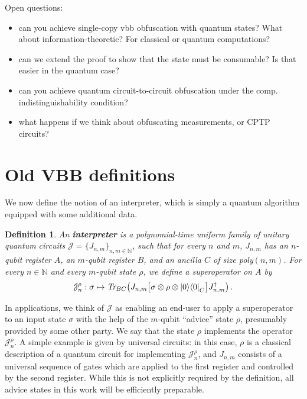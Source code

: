 \documentclass[11pt]{article}
\numberwithin{equation}{section}
\newtheorem{definition}{Definition}
\newcommand{\N}{\mathbb{N}}
\begin{document}
{Open questions:
\begin{itemize}
\item can you achieve single-copy vbb obfuscation with quantum states? What about information-theoretic? For classical or quantum computations?
\item can we extend the proof to show that the state must be consumable? Is that easier in the quantum case?
\item can you achieve quantum circuit-to-circuit obfuscation under the comp. indistinguishability condition?
\item what happens if we think about obfuscating measurements, or CPTP circuits?
\end{itemize}



\appendix

\section{Old VBB definitions}

We now define the notion of an interpreter, which is simply a quantum algorithm equipped with some additional data.

\begin{definition}
An \textbf{interpreter} is a polynomial-time uniform family of unitary quantum circuits $\mathcal J = \{J_{n, m}\}_{n, m \in \N}$, such that for every $n$ and $m$, $J_{n, m}$ has an $n$-qubit register $A$, an $m$-qubit register $B$, and an ancilla $C$ of size poly$(n, m)$. For every $n \in \N$ and every $m$-qubit state $\rho$, we define a superoperator on $A$ by
$$
\mathcal J_n^\rho : \sigma \mapsto \emph{Tr}_{BC}\bigl( J_{n, m}\bigl[ \sigma \otimes \rho \otimes {\left\vert{0}\right\rangle}{\left\langle{0}\right\vert}_C \bigr]J_{n, m}^\dagger\bigr)\,.
$$
\end{definition}

\noindent In applications, we think of $\mathcal J$ as enabling an end-user to apply a superoperator to an input state $\sigma$ with the help of the $m$-qubit ``advice'' state $\rho$, presumably provided by some other party. We say that the state $\rho$ implements the operator $\mathcal J_n^\rho$. A simple example is given by universal circuits: in this case, $\rho$ is a classical description of a quantum circuit for implementing $\mathcal J_n^\rho$, and $J_{n, m}$ consists of a universal sequence of gates which are applied to the first register and controlled by the second register. While this is not explicitly required by the definition, all advice states in this work will be efficiently preparable.


}
\end{document}

